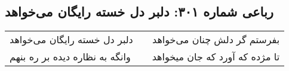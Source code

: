\begin{center}
\section*{رباعی شماره ۳۰۱: دلبر دل خسته رایگان می‌خواهد}
\label{sec:sh301}
\begin{longtable}{l p{0.5cm} r}
دلبر دل خسته رایگان می‌خواهد
&&
بفرستم گر دلش چنان می‌خواهد
\\
وانگه به نظاره دیده بر ره بنهم
&&
تا مژده که آورد که جان میخواهد
\\
\end{longtable}
\end{center}
